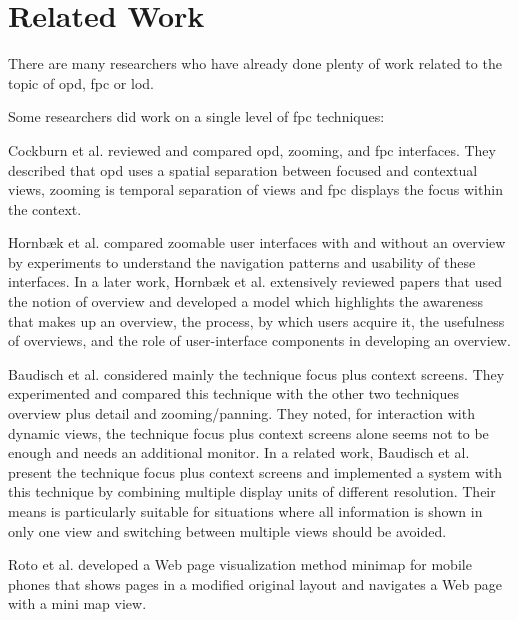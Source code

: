 
\section{Related Work}

There are many researchers who have already done plenty of work related to the topic of \gls{opd}, \gls{fpc} or \gls{lod}.

Some researchers did work on a single level of \gls{fpc} techniques:

Cockburn et al. \cite{cockburn2006review, cockburn2009review} reviewed and compared \gls{opd}, zooming, and \gls{fpc} interfaces. They described that \gls{opd} uses a spatial separation between focused and contextual views, zooming is temporal separation of views and \gls{fpc} displays the focus within the context.

Hornb{\ae}k et al. \cite{hornbaek2002navigation} compared zoomable user interfaces with and without an overview by experiments to understand the navigation patterns and usability of these interfaces. In a later work, Hornb{\ae}k et al. \cite{hornbaek2011notion} extensively reviewed papers that used the notion of overview and developed a model which highlights the awareness that makes up an overview, the process, by which users acquire it, the usefulness of overviews, and the role of user-interface components in developing an overview.

Baudisch et al. considered mainly the technique focus plus context screens.\cite{baudisch2002keeping} They experimented and compared this technique with the other two techniques overview plus detail and zooming/panning. They noted, for interaction with dynamic views, the technique focus plus context screens alone seems not to be enough and needs an additional monitor. In a related work, Baudisch et al. \cite{baudisch2001focus} present the technique focus plus context screens and implemented a system with this technique by combining multiple display units of different resolution. Their means is particularly suitable for situations where all information is shown in only one view and switching between multiple views should be avoided.

Roto et al. \cite{roto2006minimap} developed a Web page visualization method minimap for mobile phones that shows pages in a modified original layout and navigates a Web page with a mini map view.

